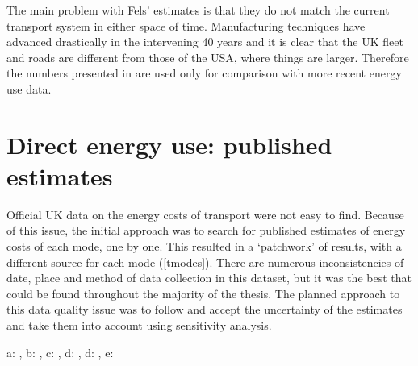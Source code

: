 The main problem with Fels' estimates is that they do not match the current
transport system in either space of time. Manufacturing techniques have
advanced drastically in the intervening 40 years and it is clear that the UK
fleet and roads are different from those of the USA, where things are larger.
Therefore the numbers presented in \citet{Fels1975} are
used only for comparison with more recent energy use data.

\section{Direct energy use: published estimates} \label{sdirecte}
Official UK data on the energy costs of transport were not easy to find.
Because of this issue, the initial approach was to search for published
estimates of energy costs of each mode, one by one. This resulted in a
`patchwork' of results, with a different source for each mode (\cref{tmodes}).
There are numerous inconsistencies of date, place and method of data collection
in this dataset, but it was the best that could be found throughout the
majority of the thesis. The planned approach to this data quality issue was to
follow \citet{Lovelace2011-assessing} and accept the uncertainty of the estimates and
take them into account using sensitivity analysis. %

\begin{table}[t]
\caption{Direct energy use of selected modes}
\label{tmodes}
\begin{footnotesize}

\vspace{1cm}
 a: \citep{Coley2002}, b: \citep{Hansard2005}, c:
\citep{MacKay2009}, d: \citep{DfT2011-commuting}, d:
\citep{LondonUnderground2007}, e: \citep{ORNL2011}
\end{footnotesize} %
\end{table}


